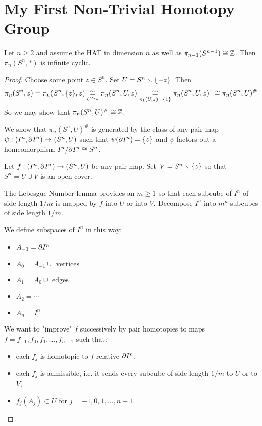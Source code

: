 \section{My First Non-Trivial Homotopy Group}

\begin{theorem}
Let $n\geq2$ and assume the HAT in dimension $n$ as well as $\pi_{n-1}(S^{n-1})\cong{\mathbb Z}$. Then $\pi_n(S^n,*)$ is infinite cyclic.
\end{theorem}

\begin{proof}
Choose some point $z\in S^n$. Set $U=S^n\smallsetminus\{-z\}$. Then \[\pi_n(S^n,z)=\pi_n(S^n,\{z\},z)\underset{U\cong *}{\cong}\pi_n(S^n,U,z)\underset{\pi_1(U,z)=\{1\}}{\cong}\pi_n(S^n,U,z)^\dagger\cong\pi_n(S^n,U)^\#\]
So we may show that $\pi_n(S^n,U)^\#\cong{\mathbb Z}$.

We show that $\pi_n(S^n,U)^\#$ is generated by the class of any pair map $\psi:(I^n,\partial I^n)\to(S^n,U)$ such that $\psi(\partial I^n)=\{z\}$ and $\psi$ factors out a homeomorphism $I^n/\partial I^n\cong S^n$.

Let $f:(I^n,\partial I^n)\to(S^n,U)$ be any pair map. Set $V=S^n\smallsetminus\{z\}$ so that $S^n=U\cup V$ is an open cover.

The Lebesgue Number lemma provides an $m\geq1$ so that each subcube of $I^n$ of side length $1/m$ is mapped by $f$ into $U$ or into $V$. Decompose $I^n$ into $m^n$ subcubes of side length $1/m$.

We define subspaces of $I^n$ in this way:
\begin{itemize}[label=-]
    \item $A_{-1}=\partial I^n$
    \item $A_0=A_{-1}\cup\text{ vertices}$
    \item $A_1=A_0\cup\text{ edges}$
    \item $A_2=\cdots$
    \item $A_n=I^n$
\end{itemize}

We want to "improve" $f$ successively by pair homotopies to maps $f=f_{-1},f_0,f_1,\dots,f_{n-1}$ such that:
\begin{itemize}
    \item each $f_j$ is homotopic to $f$ relative $\partial I^n$,
    \item each $f_j$ is admissible, i.e. it sends every subcube of side length $1/m$ to $U$ or to $V$,
    \item $f_j(A_j)\subset U$ for $j=-1,0,1,\dots,n-1$.
\end{itemize}


\end{proof}
